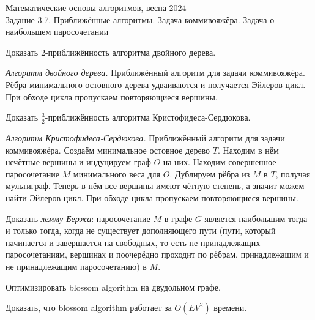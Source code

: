 \documentclass[11pt]{article}
\newenvironment{exercise}{\item}{}
\begin{document}
\begin{center}
	\Large Математические основы алгоритмов, весна 2024 \\
	\Large Задание 3.7. Приближённые алгоритмы. Задача коммивояжёра. Задача о наибольшем паросочетании
\end{center}

\begin{description}


\begin{exercise}[\ \ \ -2]
Доказать $2$-приближённость алгоритма двойного дерева.

\emph{Алгоритм двойного дерева.} Приближённый алгоритм для задачи коммивояжёра. Рёбра минимального остовного дерева удваиваются и получается Эйлеров цикл. При обходе цикла пропускаем повторяющиеся вершины.
\end{exercise}

\begin{exercise}[-3/2]
Доказать $\frac{3}{2}$-приближённость алгоритма Кристофидеса-Сердюкова.

\emph{Алгоритм Кристофидеса-Сердюкова.} Приближённый алгоритм для задачи коммивояжёра. Создаём минимальное остовное дерево $T$. Находим в нём нечётные вершины и индуцируем граф $O$ на них. Находим совершенное паросочетание $M$ минимального веса для $O$. Дублируем рёбра из $M$ в $T$, получая мультиграф. Теперь в нём все вершины имеют чётную степень, а значит можем найти Эйлеров цикл. При обходе цикла пропускаем повторяющиеся вершины.
\end{exercise}

\begin{exercise}[\ \, {-}{-}{-}]
Доказать \emph{лемму Бержа}: паросочетание $M$ в графе $G$ является наибольшим тогда и только тогда, когда не существует дополняющего пути (пути, который начинается и завершается на свободных, то есть не принадлежащих паросочетаниям, вершинах и поочерёдно проходит по рёбрам, принадлежащим и не принадлежащим паросочетанию) в $M$.
\end{exercise}

\begin{exercise}[\,bip.]
Оптимизировать blossom algorithm на двудольном графе.

\end{exercise}

\begin{exercise}[$\mathbf{EV^2}$]

Доказать, что blossom algorithm работает за $O(EV^2)$ времени.

\end{exercise}

\end{description}
\end{document}
